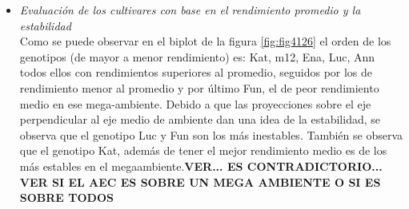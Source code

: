 \begin{itemize}[wide, nosep, labelindent = 0pt, topsep = 1ex, noitemsep,topsep=0pt]
\item \emph{Evaluación de los cultivares con base en el rendimiento promedio y la estabilidad}\\

Como se puede observar en el biplot de la figura \ref{fig:fig4126} el orden de los genotipos (de mayor a menor rendimiento) es: Kat, m12, Ena, Luc, Ann todos ellos con rendimientos superiores al promedio, seguidos por los de rendimiento menor al promedio y por último Fun, el de peor rendimiento medio en ese mega-ambiente.
Debido a que las proyecciones sobre el eje perpendicular al eje medio de ambiente dan una idea de la estabilidad, se observa que el genotipo Luc y Fun son los más inestables. También se
observa que el genotipo Kat, además de tener el mejor rendimiento medio es de los más estables en el megaambiente.\textbf{VER... ES CONTRADICTORIO... VER SI EL AEC ES SOBRE UN MEGA AMBIENTE O SI ES SOBRE TODOS}





\end{itemize}
